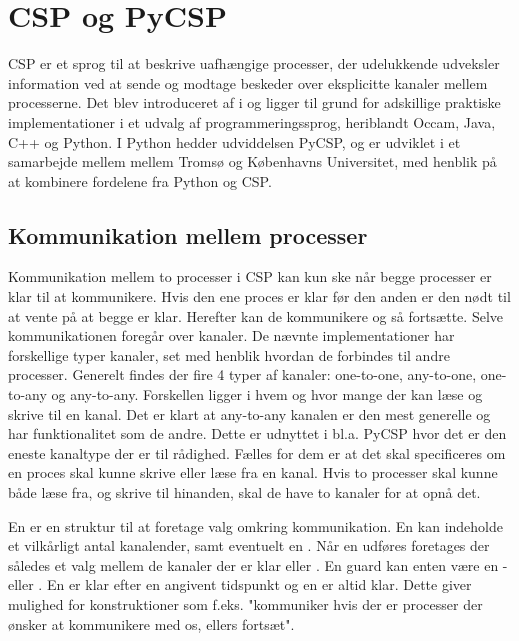 \chapter{CSP og PyCSP}
CSP er et sprog til at beskrive uafhængige processer, der udelukkende udveksler information ved at sende og modtage beskeder over eksplicitte kanaler mellem processerne. Det blev introduceret af \citeauthor{hoare-csp} i \cite{hoare-csp} og ligger til grund for adskillige praktiske implementationer i et udvalg af programmeringssprog, heriblandt Occam, Java, C++ og Python\cite{May1983, jcsp, Brown2007, pycsp}. I Python hedder udviddelsen PyCSP, og er udviklet i et samarbejde mellem mellem Tromsø og Københavns Universitet, med henblik på at kombinere fordelene fra Python og CSP. 

\section{Kommunikation mellem processer}
Kommunikation mellem to processer i CSP kan kun ske når begge processer er klar til at kommunikere. Hvis den ene proces er klar før den anden er den nødt til at vente på at begge er klar. Herefter kan de kommunikere og så fortsætte. Selve kommunikationen foregår over kanaler. De nævnte implementationer har forskellige typer kanaler, set med henblik hvordan de forbindes til andre processer. Generelt findes der fire 4 typer af kanaler: one-to-one, any-to-one, one-to-any og any-to-any. Forskellen ligger i hvem og hvor mange der kan læse og skrive til en kanal. Det er klart at any-to-any kanalen er den mest generelle og har funktionalitet som de andre. Dette er udnyttet i bl.a. PyCSP hvor det er den eneste kanaltype der er til rådighed. Fælles for dem er at det skal specificeres om en proces skal kunne skrive eller læse fra en kanal. Hvis to processer skal kunne både læse fra, og skrive til hinanden, skal de have to kanaler for at opnå det. 

En  er en struktur til at foretage valg omkring kommunikation. En  kan indeholde et vilkårligt antal kanalender, samt eventuelt en . Når en  udføres foretages der således et valg mellem de kanaler der er klar eller . En guard kan enten være en - eller . En  er klar efter en angivent tidspunkt og en  er altid klar. Dette giver mulighed for konstruktioner som f.eks. "kommuniker hvis der er processer der ønsker at kommunikere med os, ellers fortsæt". 

